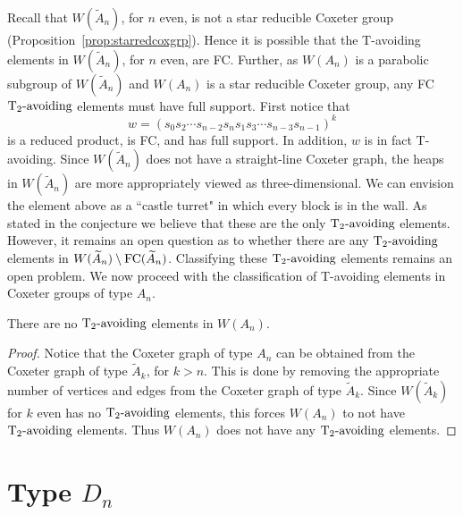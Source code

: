 Recall that $W(\widetilde{A}_n)$, for $n$ even, is not a star reducible Coxeter group (Proposition~\ref{prop:starredcoxgrp}). Hence it is possible that the T-avoiding elements in $W(\widetilde{A}_n)$, for $n$ even, are FC. Further, as $W(A_n)$ is a parabolic subgroup of $W(\widetilde{A}_n)$ and $W(A_n)$ is a star reducible Coxeter group, any FC $\operatorname{T_2-\mathrm{avoiding}}$ elements must have full support. First notice that 
\[w=(s_0s_2 \cdots s_{n-2}s_ns_1s_3 \cdots s_{n-3}s_{n-1})^k\] 
is a reduced product, is FC, and has full support. In addition, $w$ is in fact T-avoiding. Since $W(\widetilde{A}_n)$ does not have a straight-line Coxeter graph, the heaps in $W(\widetilde{A}_n)$ are more appropriately viewed as three-dimensional. We can envision the element above as a ``castle turret" in which every block is in the wall. As stated in the conjecture we believe that these are the only $\operatorname{T_2-\mathrm{avoiding}}$ elements. However, it remains an open question as to whether there are any $\operatorname{T_2-\mathrm{avoiding}}$ elements in $W(\widetilde{A}_n)\setminus \mathrm{FC}(\widetilde{A}_n)$. Classifying these $\operatorname{T_2-\mathrm{avoiding}}$ elements remains an open problem. We now proceed with the classification of T-avoiding elements in Coxeter groups of type $A_n$. 

\begin{theorem}
There are no $\operatorname{T_2-\mathrm{avoiding}}$ elements in $W(A_n)$. 
\begin{proof}
Notice that the Coxeter graph of type $A_n$ can be obtained from the Coxeter graph of type $\widetilde{A}_k$, for $k > n$. This is done by removing the appropriate number of vertices and edges from the Coxeter graph of type $\widetilde{A}_k$. Since $W(\widetilde{A}_k)$ for $k$ even has no $\operatorname{T_2-\mathrm{avoiding}}$ elements, this forces $W(A_n)$ to not have $\operatorname{T_2-\mathrm{avoiding}}$ elements. Thus $W(A_n)$ does not have any $\operatorname{T_2-\mathrm{avoiding}}$ elements.  
\end{proof}
\end{theorem}



\section{Type $D_n$}

